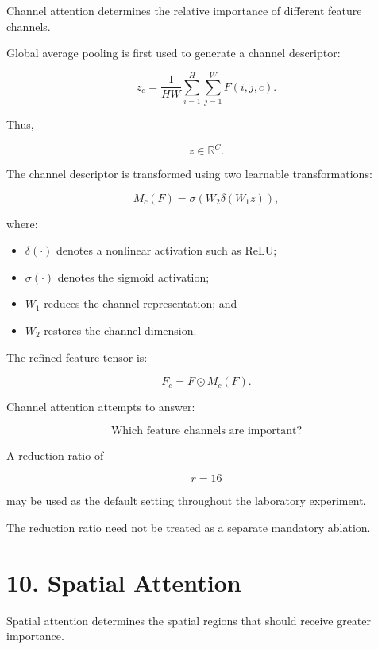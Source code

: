 \documentclass[10pt]{article}
\begin{document}
Channel attention determines the relative importance of different feature
channels.

Global average pooling is first used to generate a channel descriptor:

\[
z_c
=
\frac{1}{HW}
\sum_{i=1}^{H}
\sum_{j=1}^{W}
F(i,j,c).
\]

Thus,

\[
z\in\mathbb{R}^{C}.
\]

The channel descriptor is transformed using two learnable transformations:

\[
M_c(F)
=
\sigma
\left(
W_2
\delta
\left(
W_1z
\right)
\right),
\]

where:

\begin{itemize}

\item $\delta(\cdot)$ denotes a nonlinear activation such as ReLU;

\item $\sigma(\cdot)$ denotes the sigmoid activation;

\item $W_1$ reduces the channel representation; and

\item $W_2$ restores the channel dimension.

\end{itemize}

The refined feature tensor is:

\[
F_c
=
F\odot M_c(F).
\]

Channel attention attempts to answer:

\[
\boxed{\text{Which feature channels are important?}}
\]

A reduction ratio of

\[
r=16
\]

may be used as the default setting throughout the laboratory experiment.

The reduction ratio need not be treated as a separate mandatory ablation.

\section*{10. Spatial Attention}

Spatial attention determines the spatial regions that should receive greater
importance.
\end{document}
